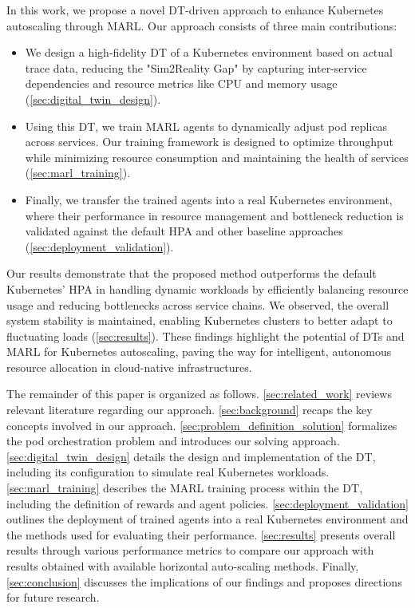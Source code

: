 \documentclass[conference]{IEEEtran}
\begin{document}
In this work, we propose a novel DT-driven approach to enhance Kubernetes autoscaling through MARL. Our approach consists of three main contributions:
\begin{itemize}
    \item We design a high-fidelity DT of a Kubernetes environment based on actual trace data, reducing the "Sim2Reality Gap" by capturing inter-service dependencies and resource metrics like CPU and memory usage (\autoref{sec:digital_twin_design}).
    \item Using this DT, we train MARL agents to dynamically adjust pod replicas across services. Our training framework is designed to optimize throughput while minimizing resource consumption and maintaining the health of services (\autoref{sec:marl_training}).
    \item Finally, we transfer the trained agents into a real Kubernetes environment, where their performance in resource management and bottleneck reduction is validated against the default HPA and other baseline approaches (\autoref{sec:deployment_validation}).
\end{itemize}

Our results demonstrate that the proposed method outperforms the default Kubernetes' HPA in handling dynamic workloads by efficiently balancing resource usage and reducing bottlenecks across service chains. We observed, the overall system stability is maintained, enabling Kubernetes clusters to better adapt to fluctuating loads (\autoref{sec:results}). These findings highlight the potential of DTs and MARL for Kubernetes autoscaling, paving the way for intelligent, autonomous resource allocation in cloud-native infrastructures.

The remainder of this paper is organized as follows.
\autoref{sec:related_work} reviews relevant literature regarding our approach.
\autoref{sec:background} recaps the key concepts involved in our approach.
\autoref{sec:problem_definition_solution} formalizes the pod orchestration problem and introduces our solving approach.
\autoref{sec:digital_twin_design} details the design and implementation of the DT, including its configuration to simulate real Kubernetes workloads.
\autoref{sec:marl_training} describes the MARL training process within the DT, including the definition of rewards and agent policies.
\autoref{sec:deployment_validation} outlines the deployment of trained agents into a real Kubernetes environment and the methods used for evaluating their performance.
\autoref{sec:results} presents overall results through various performance metrics to compare our approach with results obtained with available horizontal auto-scaling methods.
Finally, \autoref{sec:conclusion} discusses the implications of our findings and proposes directions for future research.
\end{document}
